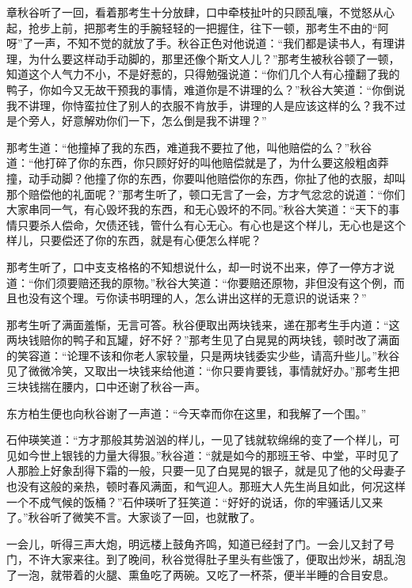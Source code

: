 \documentclass[12pt,UTF8]{ctexbook}
\begin{document}
{{{章秋谷听了一回，看着那考生十分放肆，口中牵枝扯叶的只顾乱嚷，不觉怒从心起，抢步上前，把那考生的手腕轻轻的一把握住，往下一顿，那考生不由的“阿呀”了一声，不知不觉的就放了手。秋谷正色对他说道：“我们都是读书人，有理讲理，为什么要这样动手动脚的，那里还像个斯文人儿？”那考生被秋谷顿了一顿，知道这个人气力不小，不是好惹的，只得勉强说道：“你们几个人有心撞翻了我的鸭子，你如今又无故干预我的事情，难道你是不讲理的么？”秋谷大笑道：“你倒说我不讲理，你恃蛮拉住了别人的衣服不肯放手，讲理的人是应该这样的么？我不过是个旁人，好意解劝你们一下，怎么倒是我不讲理？”

那考生道：“他撞掉了我的东西，难道我不要拉了他，叫他赔偿的么？”秋谷道：“他打碎了你的东西，你只顾好好的叫他赔偿就是了，为什么要这般粗卤莽撞，动手动脚？他撞了你的东西，你要叫他赔偿你的东西，你扯了他的衣服，却叫那个赔偿他的礼面呢？”那考生听了，顿口无言了一会，方才气忿忿的说道：“你们大家串同一气，有心毁坏我的东西，和无心毁坏的不同。”秋谷大笑道：“天下的事情只要杀人偿命，欠债还钱，管什么有心无心。有心也是这个样儿，无心也是这个样儿，只要偿还了你的东西，就是有心便怎么样呢？

那考生听了，口中支支格格的不知想说什么，却一时说不出来，停了一停方才说道：“你们须要赔还我的原物。”秋谷大笑道：“你要赔还原物，非但没有这个例，而且也没有这个理。亏你读书明理的人，怎么讲出这样的无意识的说话来？”

那考生听了满面羞惭，无言可答。秋谷便取出两块钱来，递在那考生手内道：“这两块钱赔你的鸭子和瓦罐，好不好？”那考生见了白晃晃的两块钱，顿时改了满面的笑容道：“论理不该和你老人家较量，只是两块钱委实少些，请高升些儿。”秋谷见了微微冷笑，又取出一块钱来给他道：“你只要肯要钱，事情就好办。”那考生把三块钱揣在腰内，口中还谢了秋谷一声。

东方柏生便也向秋谷谢了一声道：“今天幸而你在这里，和我解了一个围。”

石仲瑛笑道：“方才那般其势汹汹的样儿，一见了钱就软绵绵的变了一个样儿，可见如今世上银钱的力量大得狠。”秋谷道：“就是如今的那班王爷、中堂，平时见了人那脸上好象刮得下霜的一般，只要一见了白晃晃的银子，就是见了他的父母妻子也没有这般的亲热，顿时春风满面，和气迎人。那班大人先生尚且如此，何况这样一个不成气候的饭桶？”石仲瑛听了狂笑道：“好好的说话，你的牢骚话儿又来了。”秋谷听了微笑不言。大家谈了一回，也就散了。

一会儿，听得三声大炮，明远楼上鼓角齐鸣，知道已经封了门。一会儿又封了号门，不许大家来往。到了晚间，秋谷觉得肚子里头有些饿了，便取出炒米，胡乱泡了一泡，就带着的火腿、熏鱼吃了两碗。又吃了一杯茶，便半半睡的合目安息。

}}}
\end{document}

